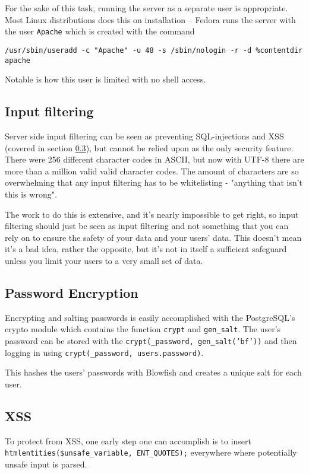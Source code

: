 \documentclass[a4paper]{scrartcl}
\begin{document}
For the sake of this task, running the server as a separate user is appropriate. Most Linux distributions does this on installation -- Fedora runs the server with the user \texttt{Apache} which is created with the command 

\texttt{/usr/sbin/useradd -c "Apache" -u 48 -s /sbin/nologin -r -d \%{contentdir} apache}

Notable is how this user is limited with no shell access.

\subsection{Input filtering}

Server side input filtering can be seen as preventing SQL-injections and XSS (covered in section \ref{subsec:XSS}), but cannot be relied upon as the only security feature. There were 256 different character codes in ASCII, but now with UTF-8 there are more than a million valid valid character codes. The amount of characters are so overwhelming that any input filtering has to be whitelisting - "anything that isn't this is wrong".

The work to do this is extensive, and it's nearly impossible to get right, so input filtering should just be seen as input filtering and not something that you can rely on to ensure the safety of your data and your users' data. This doesn't mean it's a bad idea, rather the opposite, but it's not in itself a sufficient safeguard unless you limit your users to a very small set of data.

\subsection{Password Encryption}

Encrypting and salting passwords is easily accomplished with the PostgreSQL's crypto module which contains the function \texttt{crypt} and \texttt{gen\_salt}. The user's password can be stored with the \texttt{crypt(\_password, gen\_salt('bf'))} and then logging in using \texttt{crypt(\_password, users.password)}.

This hashes the users' passwords with Blowfish and creates a unique salt for each user.

\subsection{XSS}
\label{subsec:XSS}

To protect from XSS, one early step one can accomplish is to insert \texttt{htmlentities(\$unsafe\_variable, ENT\_QUOTES);} everywhere where potentially unsafe input is parsed.
\end{document}
